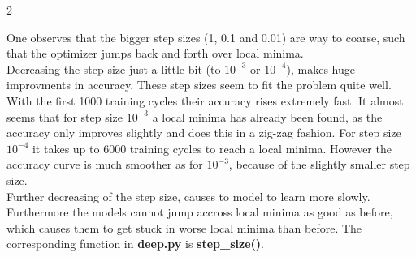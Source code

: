 \documentclass{article}
\begin{document}
\begin{ukon-infie}[3.12.17]{2}
\begin{exercise}[p=55]{}
{			One observes that the bigger step sizes (1, 0.1 and 0.01) are way to coarse, such that the optimizer jumps back and forth over local minima.\\
			Decreasing the step size just a little bit (to $10^{-3}$ or $10^{-4}$), makes huge improvments in accuracy. These step sizes seem to fit the problem quite well. With the first 1000 training cycles their accuracy rises extremely fast. It almost seems that for step size $10^{-3}$ a local minima has already been found, as the accuracy only improves slightly and does this in a zig-zag fashion. For step size $10^{-4}$ it takes up to 6000 training cycles to reach a local minima. However the accuracy curve is much smoother as for $10^{-3}$, because of the slightly smaller step size.\\
			
			Further decreasing of the step size, causes to model to learn more slowly. Furthermore the models cannot jump accross local minima as good as before, which causes them to get stuck in worse local minima than before. The corresponding function in \textbf{deep.py} is \textbf{step\_size()}.
			
			}
\end{exercise}
\end{ukon-infie}
\end{document}
